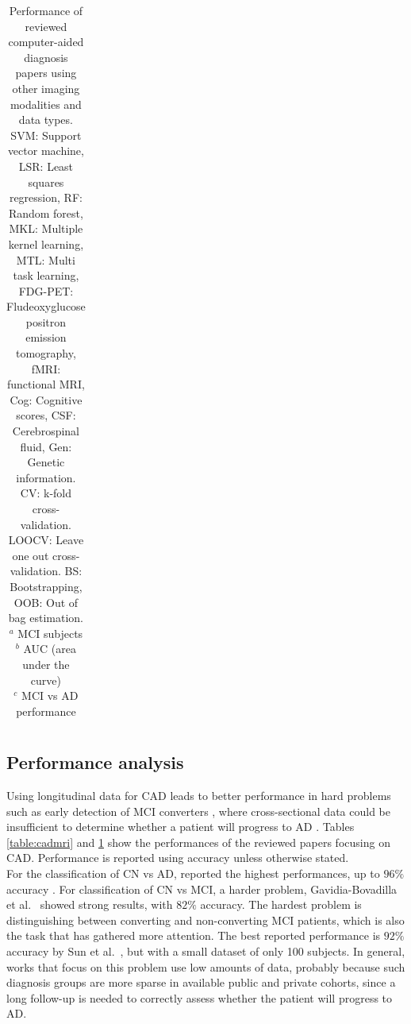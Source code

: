 \begin{table}
{\begin{tabular}{@{}lcccccllllccc@{}}
\end{tabular}}
\caption[Performance of reviewed computer-aided diagnosis papers using other imaging modalities and data types.]{\footnotesize Performance of reviewed computer-aided diagnosis papers using other imaging modalities and data types. SVM: Support vector machine, LSR: Least squares regression, RF: Random forest, MKL: Multiple kernel learning, MTL: Multi task learning, FDG-PET: Fludeoxyglucose positron emission tomography, fMRI: functional MRI, Cog: Cognitive scores, CSF: Cerebrospinal fluid, Gen: Genetic information. CV: k-fold cross- validation. LOOCV: Leave one out cross-validation. BS: Bootstrapping, OOB: Out of bag estimation.  \\
          $^{a}$ MCI subjects \\
         $^{b}$ AUC (area under the curve) \\
          $^{c}$ MCI vs AD performance \\
         }\label{table:cadmulti}
\end{table}
\normalsize

\subsection{Performance analysis}

Using longitudinal data for CAD leads to better performance in hard problems such as early detection of MCI converters \cite{Ardekani2016,Sanroma2017,Sun2017,Thung2016}, where cross-sectional data could be insufficient to determine whether a patient will progress to AD \cite{cuingnet}. Tables \ref{table:cadmri} and \ref{table:cadmulti} show the performances of the reviewed papers focusing on CAD. Performance is reported using accuracy unless otherwise stated. \\

For the classification of CN vs AD, \cite{Gavidia-Bovadilla2017,Li2012,Ortiz2017,Shi2015,Shi2017} reported the highest performances, up to $96\%$ accuracy \cite{Li2012}. For classification of CN vs MCI, a harder problem, Gavidia-Bovadilla et al.\ \cite{Gavidia-Bovadilla2017} showed strong results, with $82\%$ accuracy. The hardest problem is distinguishing between converting and non-converting MCI patients, which is also the task that has gathered more attention. The best reported performance is $92\%$ accuracy by Sun et al.\ \cite{Sun2017}, but with a small dataset of only 100 subjects. In general, works that focus on this problem use low amounts of data, probably because such diagnosis groups are more sparse in available public and private cohorts, since a long follow-up is needed to correctly assess whether the patient will progress to AD. \\

